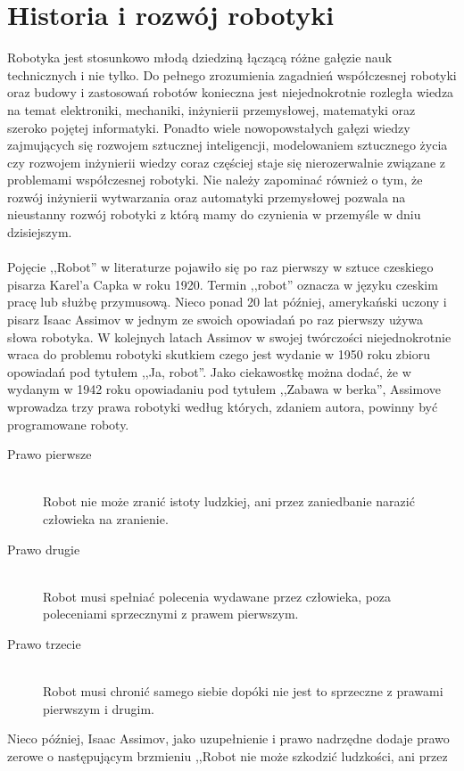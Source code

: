 \section{Historia i rozwój robotyki}
Robotyka jest stosunkowo młodą dziedziną łączącą różne gałęzie nauk technicznych
i nie tylko. Do pełnego zrozumienia zagadnień współczesnej robotyki oraz budowy i
zastosowań robotów konieczna jest niejednokrotnie rozległa wiedza na temat
elektroniki, mechaniki, inżynierii przemysłowej, matematyki oraz szeroko pojętej
informatyki. Ponadto wiele nowopowstałych gałęzi wiedzy zajmujących się rozwojem
sztucznej inteligencji, modelowaniem sztucznego życia czy rozwojem inżynierii
wiedzy coraz częściej staje się nierozerwalnie związane z problemami współczesnej
robotyki. Nie należy zapominać również o tym, że rozwój inżynierii wytwarzania
oraz automatyki przemysłowej pozwala na nieustanny rozwój robotyki z
którą mamy do czynienia w przemyśle w dniu dzisiejszym.\\
\\
Pojęcie ,,Robot'' w literaturze pojawiło się po raz pierwszy w sztuce czeskiego
pisarza Karel'a Capka w roku 1920. Termin ,,robot'' oznacza w języku czeskim
pracę lub służbę przymusową. Nieco ponad 20 lat później, amerykański uczony i
pisarz Isaac Assimov w jednym ze swoich opowiadań po raz pierwszy używa słowa
robotyka. W kolejnych latach Assimov w swojej twórczości niejednokrotnie wraca do
problemu robotyki skutkiem czego jest wydanie w 1950 roku zbioru opowiadań pod
tytułem ,,Ja, robot''. Jako ciekawostkę można dodać, że w wydanym w 1942 roku
opowiadaniu pod tytułem ,,Zabawa w berka'', Assimove wprowadza trzy prawa
robotyki według których, zdaniem autora, powinny być programowane
roboty\cite{Runaround}.
\begin{description}
\item[Prawo pierwsze] \hfill \\
Robot nie może zranić istoty ludzkiej, ani przez zaniedbanie narazić człowieka
na zranienie. 
\item[Prawo drugie] \hfill \\
Robot musi spełniać polecenia wydawane przez człowieka, poza poleceniami
sprzecznymi z prawem pierwszym.
\item[Prawo trzecie] \hfill \\
Robot musi chronić samego siebie dopóki nie jest to sprzeczne z prawami
pierwszym i drugim.
\end{description} 
Nieco później, Isaac Assimov, jako uzupełnienie i prawo nadrzędne dodaje prawo
zerowe o następującym brzmieniu ,,Robot nie może szkodzić ludzkości, ani przez
